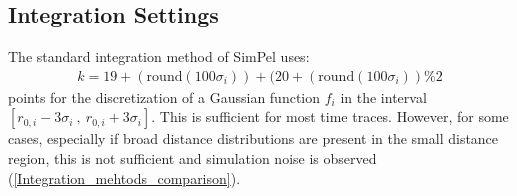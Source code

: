 \documentclass[pdftex,bezier,german,a4,twoside, headexclude,12pt,nochapterprefix, titlepage]{extarticle}
\newcommand{\simpel}{\textsf{SimPel} }
\newcommand{\figspace}{\hspace{0.5cm}}
\begin{document}
\subsection{Integration Settings}
The standard  integration method of \simpel uses:
\begin{align*}
k =  19+(\mathrm{round}(100\sigma_i)) + (20+(\mathrm{round}(100\sigma_i))\%2
\end{align*}
points for the discretization of a Gaussian function $f_i$ in the interval
$[r_{0,i}-3\sigma_i \ ,\ r_{0,i}+3\sigma_i]$. This is sufficient for most time traces. However, for some cases, especially
if broad distance distributions are present in the small distance region, this is not sufficient and simulation noise is observed
(\autoref{Integration_mehtods_comparison}).
\begin{figure}[!htb]
\centering
     \figspace
      \\[-0.3cm]

\end{figure}
\end{document}
